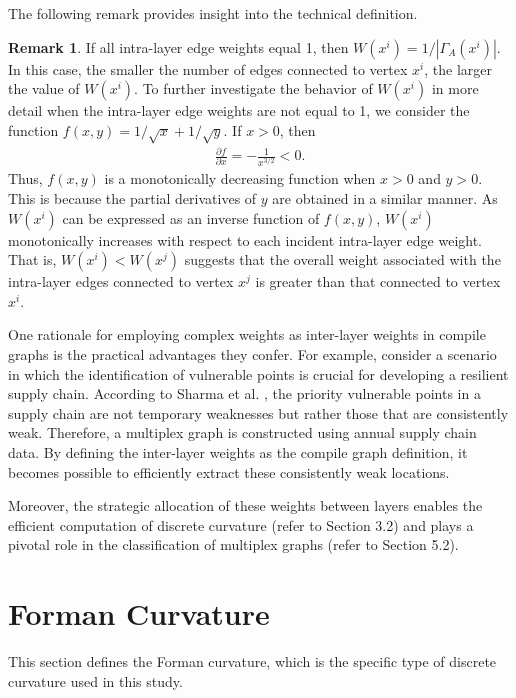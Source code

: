 \documentclass[preprint,12pt,number]{elsarticle}
\theoremstyle{plain} %
\theoremstyle{definition} %
\newtheorem{remark}[theorem]{\indent\sc Remark}
\begin{document}
The following remark provides insight into the technical definition.
\begin{remark}
    If all intra-layer edge weights equal 1, then $W(x^i)=1/|\Gamma_A(x^i)|$. In this case, the smaller the number of edges connected to vertex $x^i$, the larger the value of $W(x^i)$.
    To further investigate the behavior of $W(x^i)$ in more detail when the intra-layer edge weights are not equal to 1, we consider the function $f(x, y) = 1/\sqrt{x} + 1/\sqrt{y}$. If $x>0$, then     \begin{eqnarray*}
        \frac{\partial f}{\partial x} = - \frac{1}{x^{3/2}} < 0.
    \end{eqnarray*}
    Thus, $f(x,y)$ is a monotonically decreasing function when $x>0$ and $y>0$. This is because the partial derivatives of $y$ are obtained in a similar manner.
    As $W(x^i)$ can be expressed as an inverse function of $f(x,y)$,  $W(x^i)$ monotonically increases with respect to each incident intra-layer edge weight. That is, $W(x^i) < W(x^j)$ suggests that the overall weight associated with the intra-layer edges connected to vertex $x^j$ is greater than that connected to vertex $x^i$. 

    One rationale for employing complex weights as inter-layer weights in compile graphs is the practical advantages they confer.
    For example, consider a scenario in which the identification of vulnerable points is crucial for developing a resilient supply chain. According to Sharma et al. \cite{SCVA},  the priority vulnerable points in a supply chain are not temporary weaknesses but rather those that are consistently weak. Therefore, a multiplex graph is constructed using annual supply chain data. By defining the inter-layer weights as the compile graph definition, it becomes possible to efficiently extract these consistently weak locations.

    Moreover, the strategic allocation of these weights between layers enables the efficient computation of discrete curvature (refer to Section 3.2) and plays a pivotal role in the classification of multiplex graphs (refer to Section 5.2).
\end{remark} 
\section{Forman Curvature}
This section defines the Forman curvature, which is the specific type of discrete curvature used in this study.
\end{document}
